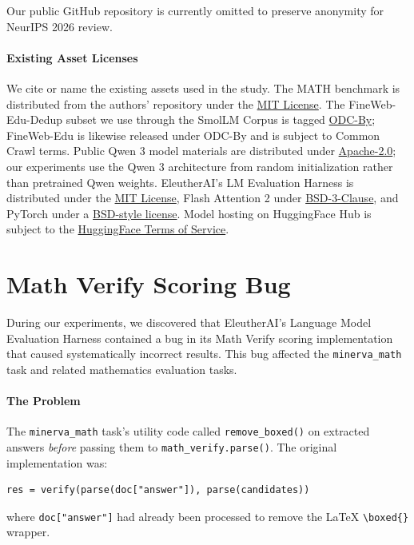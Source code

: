 
Our public GitHub repository is currently omitted to preserve anonymity for NeurIPS 2026 review.

\paragraph{Existing Asset Licenses}
We cite or name the existing assets used in the study. The MATH benchmark is distributed from the authors' repository under the \href{https://github.com/hendrycks/math/blob/main/LICENSE}{MIT License}. The FineWeb-Edu-Dedup subset we use through the SmolLM Corpus is tagged \href{https://huggingface.co/datasets/HuggingFaceTB/smollm-corpus/tree/main/fineweb-edu-dedup}{ODC-By}; FineWeb-Edu is likewise released under ODC-By and is subject to Common Crawl terms. Public Qwen 3 model materials are distributed under \href{https://huggingface.co/Qwen/Qwen3-0.6B/blob/main/LICENSE}{Apache-2.0}; our experiments use the Qwen 3 architecture from random initialization rather than pretrained Qwen weights. EleutherAI's LM Evaluation Harness is distributed under the \href{https://github.com/EleutherAI/lm-evaluation-harness/blob/main/LICENSE.md}{MIT License}, Flash Attention 2 under \href{https://github.com/Dao-AILab/flash-attention/blob/main/LICENSE}{BSD-3-Clause}, and PyTorch under a \href{https://github.com/pytorch/pytorch/blob/main/LICENSE}{BSD-style license}. Model hosting on HuggingFace Hub is subject to the \href{https://huggingface.co/terms-of-service}{HuggingFace Terms of Service}.

\clearpage

\section{Math Verify Scoring Bug}
\label{app:sec:math_verify_bug}

During our experiments, we discovered that EleutherAI's Language Model Evaluation Harness \citep{gao2024evalharness} contained a bug in its Math Verify scoring implementation that caused systematically incorrect results.
This bug affected the \texttt{minerva\_math} task and related mathematics evaluation tasks.

\paragraph{The Problem}
The \texttt{minerva\_math} task's utility code called \texttt{remove\_boxed()} on extracted answers \emph{before} passing them to \texttt{math\_verify.parse()}.
The original implementation was:
\begin{verbatim}
res = verify(parse(doc["answer"]), parse(candidates))
\end{verbatim}
where \texttt{doc["answer"]} had already been processed to remove the \LaTeX{} \verb|\boxed{}| wrapper.

